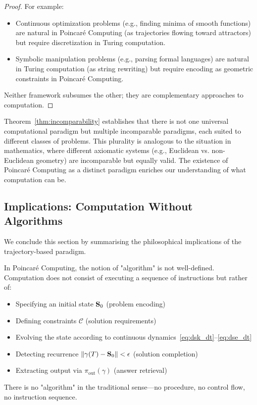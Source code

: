 \begin{proof}
For example:
\begin{itemize}
    \item Continuous optimization problems (e.g., finding minima of smooth functions) are natural in Poincaré Computing (as trajectories flowing toward attractors) but require discretization in Turing computation.
    \item Symbolic manipulation problems (e.g., parsing formal languages) are natural in Turing computation (as string rewriting) but require encoding as geometric constraints in Poincaré Computing.
\end{itemize}

Neither framework subsumes the other; they are complementary approaches to computation.
\end{proof}

\begin{remark}
\label{rem:paradigm_plurality}
Theorem~\ref{thm:incomparability} establishes that there is not one universal computational paradigm but multiple incomparable paradigms, each suited to different classes of problems. This plurality is analogous to the situation in mathematics, where different axiomatic systems (e.g., Euclidean vs. non-Euclidean geometry) are incomparable but equally valid. The existence of Poincaré Computing as a distinct paradigm enriches our understanding of what computation can be.
\end{remark}

\subsection{Implications: Computation Without Algorithms}

We conclude this section by summarising the philosophical implications of the trajectory-based paradigm.

\begin{proposition}
\label{prop:no_algorithm}
In Poincaré Computing, the notion of "algorithm" is not well-defined. Computation does not consist of executing a sequence of instructions but rather of:
\begin{itemize}
    \item Specifying an initial state $\mathbf{S}_0$ (problem encoding)
    \item Defining constraints $\mathcal{C}$ (solution requirements)
    \item Evolving the state according to continuous dynamics~\eqref{eq:dsk_dt}--\eqref{eq:dse_dt}
    \item Detecting recurrence $\|\gamma(T) - \mathbf{S}_0\| < \epsilon$ (solution completion)
    \item Extracting output via $\pi_{\text{out}}(\gamma)$ (answer retrieval)
\end{itemize}
There is no "algorithm" in the traditional sense—no procedure, no control flow, no instruction sequence.
\end{proposition}

